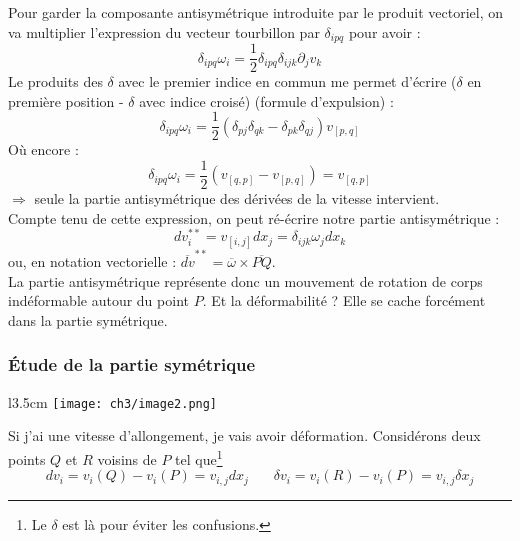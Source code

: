          Pour garder la composante antisymétrique introduite par le produit vectoriel, on va
         multiplier l'expression du vecteur tourbillon par $\delta_{ipq}$ pour avoir :
         \begin{equation}
         \delta_{ipq}\omega_i = \frac{1}{2}\delta_{ipq}\delta_{ijk}\partial_jv_k
         \end{equation}
         Le produits des $\delta$ avec le premier indice en commun me permet d'écrire ($\delta$
         en première position - $\delta$ avec indice croisé) (formule d'expulsion) :
         \begin{equation}
         \delta_{ipq}\omega_i = \frac{1}{2}(\delta_{pj}\delta_{qk} - \delta_{pk}\delta_{qj})
         v_{[p,q]}
         \end{equation}
         Où encore : 
         \begin{equation}
         \delta_{ipq}\omega_i = \frac{1}{2}(v_{[q,p]}-v_{[p,q]}) = v_{[q,p]}
         \end{equation}
         $\Rightarrow$ seule la partie antisymétrique des dérivées de la vitesse intervient.\\
         
         Compte tenu de cette expression, on peut ré-écrire notre partie antisymétrique :
         \begin{equation}
         dv_i^{**} = v_{[i,j]}dx_j = \delta_{ijk}\omega_jdx_k
         \end{equation}
         ou, en notation vectorielle : $\overline{dv}^{**} = \overline{\omega}\times
         \overline{PQ}$.\\
         La partie antisymétrique représente donc un mouvement de rotation de corps indéformable
         autour du point $P$. Et la déformabilité ? Elle se cache forcément dans la partie
         symétrique.
         
         
         
         
         
         \subsubsection{Étude de la partie symétrique}
         \begin{wrapfigure}[7]{l}{3.5cm}
        \texttt{[image: ch3/image2.png]}
        \end{wrapfigure}
         Si j'ai une vitesse d'allongement, je vais avoir déformation.  Considérons deux points
         $Q$ et $R$ voisins de $P$ tel que\footnote{Le $\delta$ est là pour éviter les confusions.}
         \begin{equation}
         dv_i = v_i(Q) - v_i(P) = v_{i,j} dx_j\ \ \ \ \ \ \ \ \delta v_i = v_i(R) - v_i(P) =
         v_{i,j}\delta x_j
         \end{equation}
         
